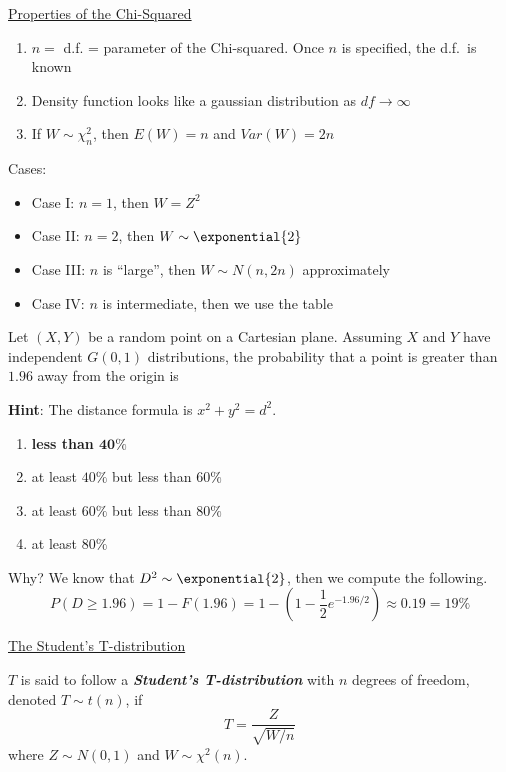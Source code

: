 \underline{Properties of the Chi-Squared}
\begin{enumerate}[label=(\roman*)]
    \item $ n= $ d.f. = parameter of the Chi-squared. Once $ n $ is specified, the d.f.\ is known
    \item Density function looks like a gaussian distribution as $ df\rightarrow\infty $
    \item If $ W \sim \chi^2_n $, then $ E(W)=n $ and $ Var(W)=2n $
\end{enumerate}
Cases:
\begin{itemize}
    \item Case I\@: $ n=1 $, then $ W=Z^2 $
    \item Case II\@: $ n=2 $, then $ W \sim \exponential{2} $
    \item Case III\@: $ n $ is ``large'', then $ W \sim N(n,2n) $ approximately
    \item Case IV\@: $ n $ is intermediate, then we use the table
\end{itemize}

Let $ (X,Y) $ be a random point on a Cartesian plane. Assuming $ X $ and $ Y $
have independent $ G(0,1) $ distributions, the probability that a point is greater
than $ 1.96 $ away from the origin is

\textbf{Hint}: The distance formula is $ x^2+y^2=d^2 $.
\begin{enumerate}[label=(\Alph*)]
    \item \textbf{less than $ \symbf{40\%} $}
    \item at least $ 40\% $ but less than $ 60\% $
    \item at least $ 60\% $ but less than $ 80\% $
    \item at least $ 80\% $
\end{enumerate}
Why? We know that $ D^2 \sim \exponential{2} $, then we compute the following.
\[ P(D\geqslant 1.96)=1-F(1.96)=1-\left( 1-\frac{1}{2} e^{-1.96/2} \right)\approx 0.19=19\% \]

\underline{The Student's T-distribution}

\begin{Definition}{}{}
    $ T $ is said to follow a \textbf{\emph{Student's T-distribution}} with
    $ n $ degrees of freedom, denoted $ T \sim t(n) $, if
    \[ T=\frac{Z}{\sqrt{W/n}}  \]
    where $ Z \sim N(0,1) $ and $ W \sim \chi^2(n) $.
\end{Definition}

